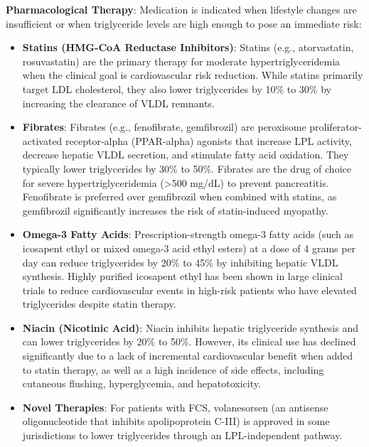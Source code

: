 \textbf{Pharmacological Therapy}:
Medication is indicated when lifestyle changes are insufficient or when triglyceride levels are high enough to pose an immediate risk:
\begin{itemize}
    \item \textbf{Statins (HMG-CoA Reductase Inhibitors)}: Statins (e.g., atorvastatin, rosuvastatin) are the primary therapy for moderate hypertriglyceridemia when the clinical goal is cardiovascular risk reduction. While statins primarily target LDL cholesterol, they also lower triglycerides by 10\% to 30\% by increasing the clearance of VLDL remnants.
    \item \textbf{Fibrates}: Fibrates (e.g., fenofibrate, gemfibrozil) are peroxisome proliferator-activated receptor-alpha (PPAR-alpha) agonists that increase LPL activity, decrease hepatic VLDL secretion, and stimulate fatty acid oxidation. They typically lower triglycerides by 30\% to 50\%. Fibrates are the drug of choice for severe hypertriglyceridemia (>500 mg/dL) to prevent pancreatitis. Fenofibrate is preferred over gemfibrozil when combined with statins, as gemfibrozil significantly increases the risk of statin-induced myopathy.
    \item \textbf{Omega-3 Fatty Acids}: Prescription-strength omega-3 fatty acids (such as icosapent ethyl or mixed omega-3 acid ethyl esters) at a dose of 4 grams per day can reduce triglycerides by 20\% to 45\% by inhibiting hepatic VLDL synthesis. Highly purified icosapent ethyl has been shown in large clinical trials to reduce cardiovascular events in high-risk patients who have elevated triglycerides despite statin therapy.
    \item \textbf{Niacin (Nicotinic Acid)}: Niacin inhibits hepatic triglyceride synthesis and can lower triglycerides by 20\% to 50\%. However, its clinical use has declined significantly due to a lack of incremental cardiovascular benefit when added to statin therapy, as well as a high incidence of side effects, including cutaneous flushing, hyperglycemia, and hepatotoxicity.
    \item \textbf{Novel Therapies}: For patients with FCS, volanesorsen (an antisense oligonucleotide that inhibits apolipoprotein C-III) is approved in some jurisdictions to lower triglycerides through an LPL-independent pathway.
\end{itemize}


